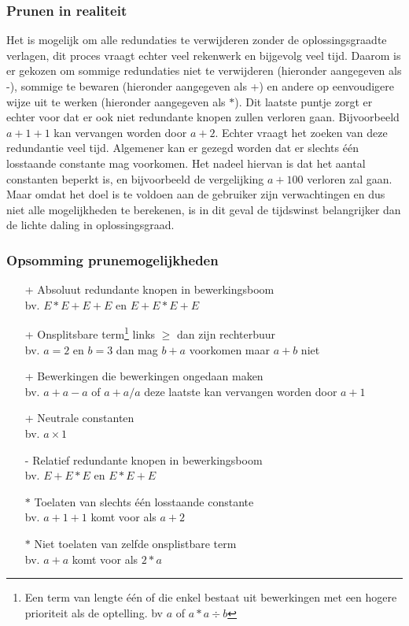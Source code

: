 \documentclass[Main.tex]{subfiles}
\begin{document}
\subsubsection*{Prunen in realiteit}
Het is mogelijk om alle redundaties te verwijderen zonder de oplossingsgraad\footnotemark[\ref{note:oplossingsgraad}]
te verlagen, dit proces vraagt echter veel rekenwerk en bijgevolg veel tijd. Daarom is er gekozen om sommige redundaties niet te verwijderen (hieronder aangegeven als -), sommige te bewaren (hieronder aangegeven als +) en andere op eenvoudigere wijze uit te werken (hieronder aangegeven als $\ast$). Dit laatste puntje zorgt er echter voor dat er ook niet redundante knopen zullen verloren gaan. Bijvoorbeeld $a+1+1$ kan vervangen worden door $a+2$. Echter vraagt het zoeken van deze redundantie veel tijd. Algemener kan er gezegd worden dat er slechts één losstaande constante mag voorkomen. Het nadeel hiervan is dat het aantal constanten beperkt is, en bijvoorbeeld de vergelijking $a+100$ verloren zal gaan. Maar omdat het doel is te voldoen aan de gebruiker zijn verwachtingen en dus niet alle mogelijkheden te berekenen, is in dit geval de tijdswinst belangrijker dan de lichte daling in oplossingsgraad\footnotemark[\ref{note:oplossingsgraad}].
\subsubsection*{Opsomming prunemogelijkheden}

\begin{itemize}
\item[+] Absoluut redundante knopen in bewerkingsboom\\
bv. $E \ast E+E+E$ en $E+E \ast E+E$
\item[+] Onsplitsbare term\footnote{\label{note:onsplitsbaar}Een term van lengte \'e\'en of die enkel bestaat uit bewerkingen met een hogere prioriteit als de optelling. bv $a$ of $a \ast a \div b$}
links $\geq$ dan zijn rechterbuur\\
	bv. $a=2$ en $b=3$ dan mag $b+a$ voorkomen maar $a+b$ niet
\item[+] Bewerkingen die bewerkingen ongedaan maken\\
	bv. $a+a-a$ of $a+a/a$ deze laatste kan vervangen worden door $a+1$
\item[+] Neutrale constanten\\
	bv. $a \times 1$
\item[-] Relatief redundante knopen in bewerkingsboom\\
	bv. $E+E \ast E$ en $E \ast E+E$
\item[$\ast$] Toelaten van slechts één losstaande constante \\
	bv. $a+1+1$ komt voor als $a+2$
\item[$\ast$] Niet toelaten van zelfde onsplistbare term\footnotemark[\ref{note:onsplitsbaar}]\\
	bv. $a+a$ komt voor als $2 \ast a$
\end{itemize}
\end{document}
